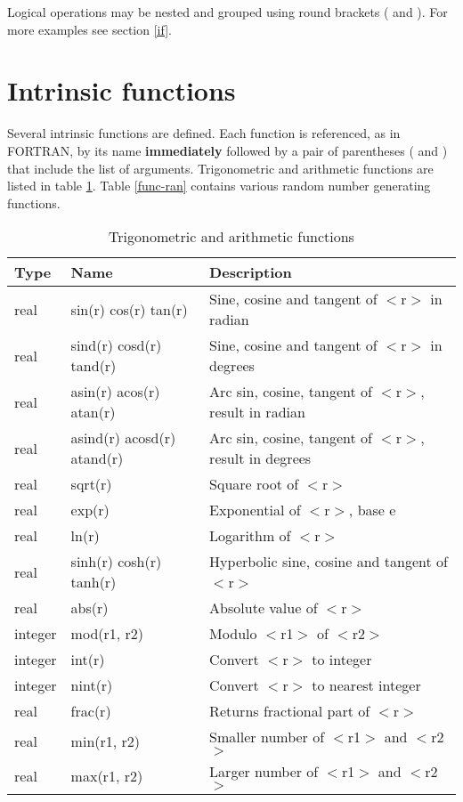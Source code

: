 Logical operations may be nested and grouped using round brackets (
and ). For more examples see section \ref{if}.


\section{Intrinsic functions \label{func}}

Several intrinsic functions are defined.  Each function is
referenced, as in FORTRAN, by its name {\bf immediately} followed by
a pair of parentheses ( and ) that include the list of arguments.
Trigonometric and arithmetic functions are listed in table
\ref{func-trig}.  Table \ref{func-ran} contains various random
number generating functions.

\begin{table}[!tb]
\centering
\begin{tabularx}{\textwidth}{|p{15mm}|p{45mm}|X|}
  \hline
  {\bf Type} & {\bf Name} & {\bf Description} \\
  \hline \hline
  real & sin(r) cos(r) tan(r) &
         Sine, cosine and tangent of $<$r$>$ in radian \\
  real & sind(r) cosd(r) tand(r) &
         Sine, cosine and tangent of $<$r$>$ in degrees \\
  real & asin(r) acos(r) atan(r) &
         Arc sin, cosine, tangent of $<$r$>$, result in radian \\
  real & asind(r) acosd(r) atand(r) &
         Arc sin, cosine, tangent of $<$r$>$, result in degrees \\
  \hline
  real & sqrt(r) & Square root of $<$r$>$ \\
  real & exp(r) &  Exponential of $<$r$>$, base e \\
  real & ln(r) &   Logarithm of $<$r$>$ \\
  real & sinh(r) cosh(r) tanh(r) &
                   Hyperbolic sine, cosine and tangent of $<$r$>$ \\
  \hline
  real    & abs(r)      &  Absolute value of $<$r$>$ \\
  integer & mod(r1, r2) &  Modulo $<$r1$>$ of $<$r2$>$ \\
  integer & int(r)      &  Convert $<$r$>$ to integer \\
  integer & nint(r)     &  Convert $<$r$>$ to nearest integer \\
  real    & frac(r)     &  Returns fractional part of $<$r$>$ \\
  \hline
  real    & min(r1, r2) &  Smaller number of $<$r1$>$ and $<$r2$>$ \\
  real    & max(r1, r2) &  Larger number of $<$r1$>$ and $<$r2$>$ \\
  \hline
\end{tabularx}
\caption{\label{func-trig}Trigonometric and arithmetic functions}
\end{table}

